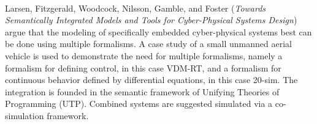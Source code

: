 

\ \hline \ %

Larsen, Fitzgerald, Woodcock, Nilsson, Gamble, and Foster
\cite{isola-2016-larsen}
({\em Towards Semantically Integrated Models and Tools for
Cyber-Physical Systems Design})
argue that the modeling of specifically embedded 
cyber-physical systems best can be done using multiple 
formalisms. A case study of a small unmanned
aerial vehicle is used to demonstrate the need for multiple formalisms, namely a formalism for defining control, in this case VDM-RT, and a formalism for continuous behavior defined by differential equations, in this case 20-sim. The integration is founded in the semantic framework of Unifying Theories of Programming (UTP). Combined systems are suggested simulated via
a co-simulation framework.

\done{}